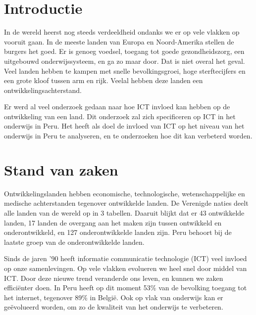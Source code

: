 
\section{Introductie} %
\label{sec:introductie}

In de wereld heerst nog steeds  verdeeldheid ondanks we er op vele vlakken op vooruit gaan. In de meeste landen van  Europa en Noord-Amerika stellen de burgers het goed. Er is genoeg voedsel, toegang tot goede gezondheidszorg, een uitgebouwd onderwijssysteem, en ga zo maar door. Dat is niet overal het geval. Veel landen hebben te kampen met snelle bevolkingsgroei, hoge sterftecijfers en een grote kloof tussen arm en rijk. Veelal hebben deze landen een ontwikkelingsachterstand. 

Er werd al veel onderzoek gedaan naar hoe ICT invloed kan hebben op de ontwikkeling van een land. Dit onderzoek zal zich specificeren op ICT in het onderwijs in Peru. Het heeft als doel de invloed van ICT op het niveau van het onderwijs in Peru te analyseren, en te onderzoeken hoe dit kan verbeterd worden. 


\section{Stand van zaken}
\label{sec:state-of-the-art}
Ontwikkelingslanden hebben economische, technologische, wetenschappelijke en medische achterstanden tegenover ontwikkelde landen. De Verenigde naties deelt alle landen van de wereld op in 3 tabellen. Daaruit blijkt dat er 43 ontwikkelde landen, 17 landen de overgang aan het maken zijn tussen ontwikkeld en onderontwikkeld, en 127 onderontwikkelde landen zijn. \autocite{unitednations2019} Peru behoort bij de laatste groep van de onderontwikkelde landen. 

Sinds de jaren '90 heeft informatie communicatie technologie (ICT) veel invloed op onze samenlevingen. Op vele vlakken evolueren we heel snel door middel van ICT. Door deze nieuwe trend veranderde ons leven, en kunnen we zaken  effici\"enter doen. In Peru heeft op dit moment 53\% van de bevolking toegang tot het internet, tegenover 89\% in Belgi\"e. \autocite{itu2018} Ook op vlak van onderwijs kan er ge\"evolueerd worden, om zo de kwaliteit van het onderwijs te verbeteren.

